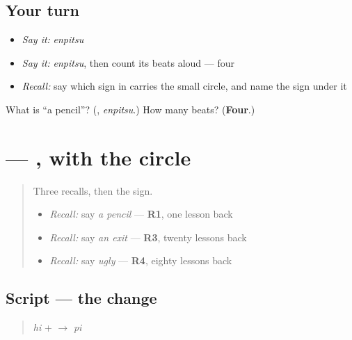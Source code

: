 \subsection*{Your turn}
\begin{itemize}
\raggedright
  \item \emph{Say it:} \emph{enpitsu}
  \item \emph{Say it:} \emph{enpitsu}, then count its beats aloud — four
  \item \emph{Recall:} say which sign in \textbf{} carries the small circle, and name the sign under it
\end{itemize}

\begin{tcolorbox}[breakable,colback=teal!4,colframe=teal!35!black,title={Before you move on}]
What is \textquotedblleft{}a pencil\textquotedblright{}? (\textbf{}, \emph{enpitsu}.) How many beats? (\textbf{Four}.)
\end{tcolorbox}
\section[\texorpdfstring{\ja{ぴ} (pi)}{ぴ (pi)}]{ — , with the circle}

\label{lesson:JA-W137-pi}



\begin{quote}
Three recalls, then the sign.

\begin{itemize}
\raggedright
  \item \emph{Recall:} say \emph{a pencil} — \textbf{R1}, one lesson back
  \item \emph{Recall:} say \emph{an exit} — \textbf{R3}, twenty lessons back
  \item \emph{Recall:} say \emph{ugly} — \textbf{R4}, eighty lessons back
\end{itemize}
\end{quote}

\subsection*{Script — the change}

\begin{quote}
\textbf{} \emph{hi} + \textbf{} $\to$ \textbf{} \emph{pi}
\end{quote}

